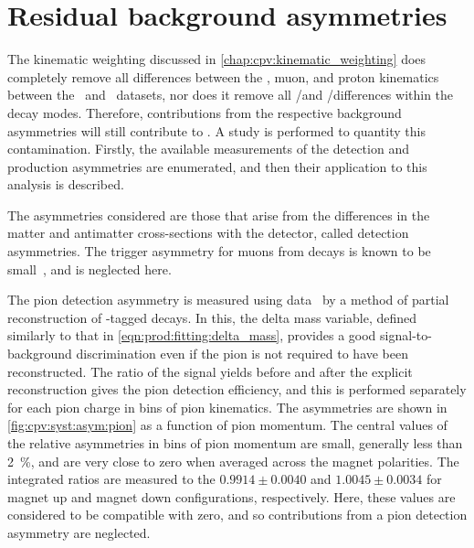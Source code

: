 \begin{table}
  \centering
  \caption{%
    Differences between asymmetries measured with the nominal fit method and 
    the sideband subtraction, measured for each data sub-sample and combination 
    of sub-samples.
    The uncertainties quoted assume the values found by the two methods are 
    fully correlated.
    The computation of the combinations, ``2011 + 2012'' and ``Average'', is 
    defined in \cref{chap:cpv:results:combination}.
  }
  \label{tab:cpv:syst:sbs_differences}
  
\end{table}

\section{Residual background asymmetries}
\label{chap:cpv:syst:asym}

The kinematic weighting discussed in \cref{chap:cpv:kinematic_weighting} does 
completely remove all differences between the \PLambdab, muon, and proton 
kinematics between the \pKK\ and \ppipi\ datasets, nor does it remove all 
\PKminus/\PKplus and \Ppiminus/\Ppiplus differences within the decay modes.
Therefore, contributions from the respective background asymmetries will still 
contribute to \dACP\@.
A study is performed to quantity this contamination.
Firstly, the available measurements of the detection and production asymmetries 
are enumerated, and then their application to this analysis is described.

The asymmetries considered are those that arise from the differences in the 
matter and antimatter cross-sections with the detector, called detection 
asymmetries.
The trigger asymmetry for muons from \PB decays is known to be 
small~\cite{Aaij:2016yze}, and is neglected here.

The pion detection asymmetry is measured using  
data~\cite{Aaij:2012cy} by a method of partial reconstruction of 
\PDstarp-tagged \decay{\PDzero}{\PKminus\Ppiplus\Ppiminus\Ppiplus} decays.
In this, the delta mass variable, defined similarly to that in 
\cref{eqn:prod:fitting:delta_mass}, provides a good signal-to-background 
discrimination even if the pion is not required to have been reconstructed.
The ratio of the signal yields before and after the explicit reconstruction 
gives the pion detection efficiency, and this is performed separately for each 
pion charge in bins of pion kinematics.
The asymmetries are shown in \cref{fig:cpv:syst:asym:pion} as a function of 
pion momentum.
The central values of the relative asymmetries in bins of pion momentum are 
small, generally less than \SI{2}{\percent}, and are very close to zero when 
averaged across the magnet polarities.
The integrated ratios are measured to the $0.9914 \pm 0.0040$ and $1.0045 \pm 
0.0034$ for magnet up and magnet down configurations, respectively.
Here, these values are considered to be compatible with zero, and so 
contributions from a pion detection asymmetry are neglected.


